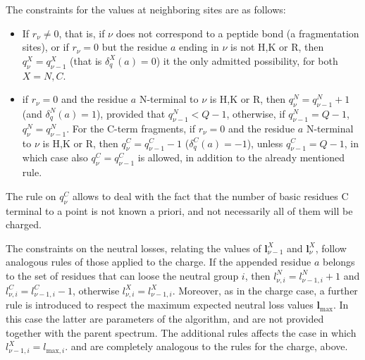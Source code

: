 The constraints for the values at neighboring sites are as follows:
\begin{itemize}
 \item If  $r_\nu \ne 0$, that is, if $\nu$ does not correspond to a peptide bond (a fragmentation sites), or if $r_\nu = 0$ but the residue $a$ ending in $\nu$ is not H,K or R, then
 $q^X_\nu=q^X_{\nu-1}$  (that is $\delta_q^X(a)=0$) it the only admitted possibility, for both $X=N,C$.

\item if $r_\nu = 0$ and the residue $a$ N-terminal to $\nu$ is  H,K or R, then
$q^N_\nu=q^N_{\nu-1}+1$ (and $\delta_q^N(a)=1$), provided that $q^N_{\nu-1}<Q-1$, otherwise, 
if $q^N_{\nu-1}=Q-1$, $q^N_\nu=q^N_{\nu-1}$.
For the C-term fragments, if $r_\nu = 0$ and the residue $a$ N-terminal to $\nu$ is  H,K or R, then
$q^C_\nu=q^C_{\nu-1}-1$ ($\delta_q^C(a)=-1$), unless $q^C_{\nu-1}=Q-1$, in which case also  $q^C_\nu=q^C_{\nu-1}$ is allowed, in addition to the already mentioned rule.
\end{itemize}
The rule on $q^C_\nu$ allows to deal with the fact that the number of basic residues C terminal to a point is not known  a priori, and not necessarily all of them will be charged.



The constraints on the neutral losses, 
relating  the values of $\bm l^X_{\nu-1}$ and $\bm l^X_\nu$, 
follow
analogous rules of those applied to the charge.
If the appended residue $a$ belongs to the set of residues that can 
loose the neutral group $i$, then $l^N_{\nu,i}=l^N_{\nu-1,i}+1$
and $l^C_{\nu,i}=l^C_{\nu-1,i}-1$, otherwise $l^X_{\nu,i}=l^X_{\nu-1,i}$.
Moreover, as in the charge case, a further rule is introduced to
respect the maximum expected neutral loss values $\bm l_\text{max}$. 
In this case the latter are  parameters of the algorithm, and are not provided together with the parent spectrum.  
The additional rules affects the case in which %
$
l^X_{\nu-1,i}=l_{\text{max},i}$. 
and are completely analogous to the  rules for the charge,  above.


